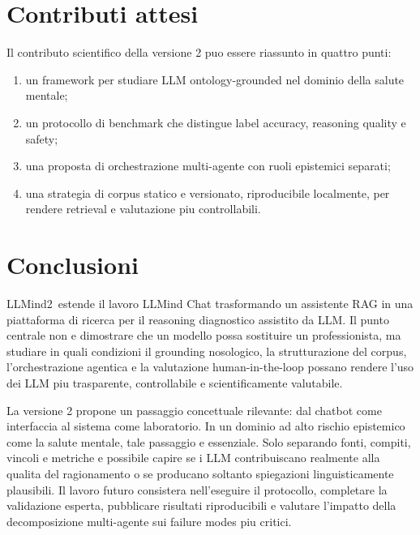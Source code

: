 \documentclass[11pt,a4paper]{article}
\newcommand{\llmind}{LLMind2}
\begin{document}
\section{Contributi attesi}
Il contributo scientifico della versione 2 puo essere riassunto in quattro punti:
\begin{enumerate}
  \item un framework per studiare LLM ontology-grounded nel dominio della salute mentale;
  \item un protocollo di benchmark che distingue label accuracy, reasoning quality e safety;
  \item una proposta di orchestrazione multi-agente con ruoli epistemici separati;
  \item una strategia di corpus statico e versionato, riproducibile localmente, per rendere retrieval e valutazione piu controllabili.
\end{enumerate}

\section{Conclusioni}
\llmind\ estende il lavoro LLMind Chat trasformando un assistente RAG in una piattaforma di ricerca per il reasoning diagnostico assistito da LLM. Il punto centrale non e dimostrare che un modello possa sostituire un professionista, ma studiare in quali condizioni il grounding nosologico, la strutturazione del corpus, l'orchestrazione agentica e la valutazione human-in-the-loop possano rendere l'uso dei LLM piu trasparente, controllabile e scientificamente valutabile.

La versione 2 propone un passaggio concettuale rilevante: dal chatbot come interfaccia al sistema come laboratorio. In un dominio ad alto rischio epistemico come la salute mentale, tale passaggio e essenziale. Solo separando fonti, compiti, vincoli e metriche e possibile capire se i LLM contribuiscano realmente alla qualita del ragionamento o se producano soltanto spiegazioni linguisticamente plausibili. Il lavoro futuro consistera nell'eseguire il protocollo, completare la validazione esperta, pubblicare risultati riproducibili e valutare l'impatto della decomposizione multi-agente sui failure modes piu critici.
\end{document}
